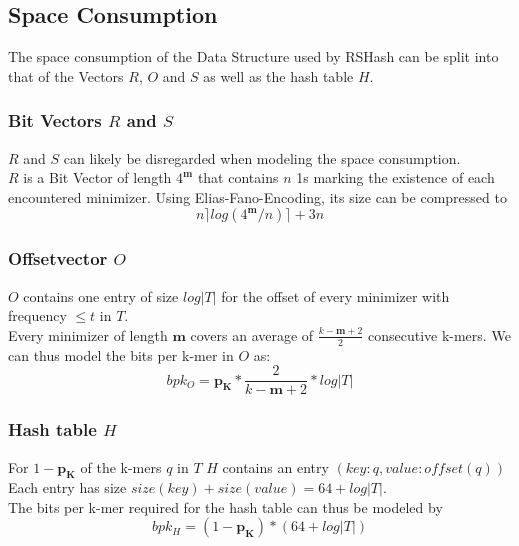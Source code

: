 \documentclass{article}
\newcommand{\percKmers}{\textbf{p}_\textbf{K}}
\newcommand{\minimizerLength}{\textbf{m}}
\begin{document}
\subsection*{Space Consumption}
The space consumption of the Data Structure used by RSHash can be split into that of the Vectors $R$, $O$ and $S$ as well as the hash table $H$.

\subsubsection*{Bit Vectors $R$ and $S$}
$R$ and $S$ can likely be disregarded when modeling the space consumption. \\
$R$ is a Bit Vector of length $4^\minimizerLength$ that contains $n$  1s marking the existence of each encountered minimizer. Using Elias-Fano-Encoding, its size can be compressed to
\[ n \rceil log(4^\minimizerLength/n) \rceil + 3n\]

\subsubsection*{Offsetvector $O$}
$O$ contains one entry of size $log |T|$ for the offset of every minimizer with frequency $\leq t$ in $T$.\\
Every minimizer of length $\minimizerLength$ covers an average of $\frac{k-\minimizerLength+2}{2}$ consecutive k-mers. We can thus model the bits per k-mer in $O$ as:\\
\[bpk_O = \percKmers * \frac{2}{k-\minimizerLength+2} * log |T| \]

\subsubsection*{Hash table $H$}
For $1-\percKmers$ of the k-mers $q$ in $T$ $H$ contains an entry $(key:q, value:offset(q))$\\
Each entry has size $size(key) + size(value) = 64 + log |T|$.\\
The bits per k-mer required for the hash table can thus be modeled by
\[ bpk_H = (1-\percKmers) * (64 + log|T|)\]
\end{document}
